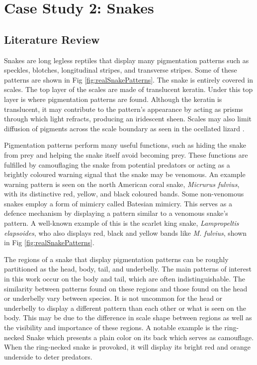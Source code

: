 
\chapter{Case Study 2: Snakes}
\section{Literature Review}
Snakes are long legless reptiles that display many pigmentation patterns such as speckles, blotches, longitudinal stripes, and transverse stripes. Some of these patterns are shown in Fig \ref{fig:realSnakePatterns}. The snake is entirely covered in scales. The top layer of the scales are made of translucent keratin. Under this top layer is where pigmentation patterns are found. Although the keratin is translucent, it may contribute to the pattern's appearance by acting as prisms through which light refracts, producing an iridescent sheen. Scales may also limit diffusion of pigments across the scale boundary as seen in the ocellated lizard \citep{manukyan2017}.

Pigmentation patterns perform many useful functions, such as hiding the snake from prey and helping the snake itself avoid becoming prey. These functions are fulfilled by camouflaging the snake from potential predators or acting as a brightly coloured warning signal that the snake may be venomous. An example warning pattern is seen on the north American coral snake, \textit{Micrurus fulvius}, with its distinctive red, yellow, and black coloured bands. Some non-venomous snakes employ a form of mimicry called Batesian mimicry. This serves as a defence mechanism by displaying a pattern similar to a venomous snake's pattern. A well-known example of this is the scarlet king snake, \textit{Lampropeltis elapsoides}, who also displays red, black and yellow bands like \textit{M. fulvius}, shown in Fig \ref{fig:realSnakePatterns}.

The regions of a snake that display pigmentation patterns can be roughly partitioned as the head, body, tail, and underbelly. The main patterns of interest in this work occur on the body and tail, which are often indistinguishable. The similarity between patterns found on these regions and those found on the head or underbelly vary between species. It is not uncommon for the head or underbelly to display a different pattern than each other or what is seen on the body. This may be due to the difference in scale shape between regions as well as the visibility and importance of these regions. A notable example is the ring-necked Snake which presents a plain color on its back which serves as camouflage. When the ring-necked snake is provoked, it will display its bright red and orange underside to deter predators.

